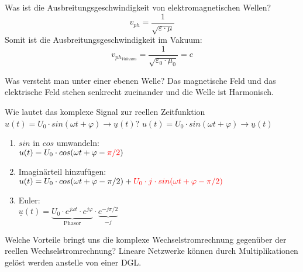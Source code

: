 \begin{karte}{Was ist die Ausbreitungsgeschwindigkeit von elektromagnetischen Wellen?}
	\Large
	\begin{equation*}
		v_{ph} = \frac{1}{\sqrt{\varepsilon \cdot \mu}}
	\end{equation*}	
	 \normalsize
	Somit ist die Ausbreitungsgeschwindigkeit im Vakuum:
	\begin{equation*}
		v_{ph_{Vakuum}} = \frac{1}{\sqrt{\varepsilon_0 \cdot \mu_0}} = c
	\end{equation*}
	
\end{karte}

\begin{karte}{Was versteht man unter einer ebenen Welle?}
	Das magnetische Feld und das elektrische Feld stehen senkrecht zueinander und die Welle ist Harmonisch.\\
\end{karte}

\begin{karte}{Wie lautet das komplexe Signal zur reellen Zeitfunktion\\
	$ u(t) = U_0 \cdot sin(\omega t + \varphi) \rightarrow  \underline{u}(t)$?}
	$ u(t) = U_0 \cdot sin(\omega t + \varphi) \rightarrow  \underline{u}(t)$\\
	\begin{enumerate}
		\item $ sin $ in $ cos $ umwandeln:\\
		$ u(t)=U_0 \cdot cos(\omega t + \varphi - \color{red}{\pi/2} \normalcolor) $
		\item Imaginärteil hinzufügen:\\
		$ u(t)=U_0 \cdot cos(\omega t + \varphi - \pi/2) + 
		\color{red}{U_0 \cdot j \cdot sin (\omega t + \varphi-\pi/2)}$
		\item Euler:\\
		$ \underline{u}(t) = \underbrace{U_0 \cdot e^{j\omega t} \cdot 
		e^{j\varphi}}_{\text{Phasor}} \cdot \underbrace{e^{-j \pi/2}}_{-j} $
	\end{enumerate}
\end{karte}

\begin{karte}{Welche Vorteile bringt uns die komplexe Wechselstromrechnung gegenüber der reellen Wechselstromrechnung?}
	Lineare Netzwerke können durch Multiplikationen gelöst werden anstelle von einer DGL.
\end{karte}
